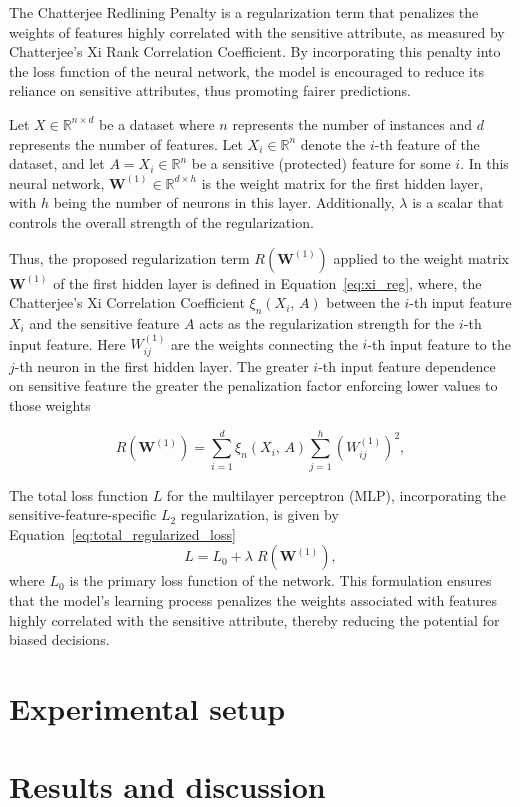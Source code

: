 The Chatterjee Redlining Penalty is a regularization term that penalizes the weights of features highly correlated with the sensitive attribute, as measured by Chatterjee's Xi Rank Correlation Coefficient. By incorporating this penalty into the loss function of the neural network, the model is encouraged to reduce its reliance on sensitive attributes, thus promoting fairer predictions.

Let $X \in \mathbb{R}^{n \times d}$ be a dataset where $n$ represents the number of instances and $d$ represents the number of features. Let $X_i \in \mathbb{R}^n$ denote the $i$-th feature of the dataset, and let $A = X_i \in \mathbb{R}^n$ be a sensitive (protected) feature for some $i$. In this neural network, $\mathbf{W}^{(1)} \in \mathbb{R}^{d \times h}$ is the weight matrix for the first hidden layer, with $h$ being the number of neurons in this layer. Additionally, $\lambda$ is a scalar that controls the overall strength of the regularization.

Thus, the proposed regularization term $R(\mathbf{W}^{(1)})$ applied to the weight matrix $\mathbf{W}^{(1)}$ of the first hidden layer is defined in Equation~\ref{eq:xi_reg}, where, the Chatterjee's Xi Correlation Coefficient $\xi_n(X_i,\,A)$ between the $i$-th input feature $X_i$ and the sensitive feature $A$ acts as the regularization strength for the $i$-th input feature. Here $W^{(1)}_{ij}$ are the weights connecting the $i$-th input feature to the $j$-th neuron in the first hidden layer. The greater $i$-th input feature dependence on sensitive feature the greater the penalization factor enforcing lower values to those weights

\begin{equation}\label{eq:xi_reg}
R(\mathbf{W}^{(1)}) = \sum_{i=1}^d \xi_n(X_i,\,A) \sum_{j=1}^h (W^{(1)}_{ij})^2,
\end{equation}


The total loss function $L$ for the multilayer perceptron (MLP), incorporating the sensitive-feature-specific $L_2$ regularization, is given by Equation~\ref{eq:total_regularized_loss}
\begin{equation}\label{eq:total_regularized_loss}
L = L_0 + \lambda \; R(\mathbf{W}^{(1)}),
\end{equation}
where $L_0$ is the primary loss function of the network. This formulation ensures that the model's learning process penalizes the weights associated with features highly correlated with the sensitive attribute, thereby reducing the potential for biased decisions.


\section{Experimental setup}

\section{Results and discussion}
